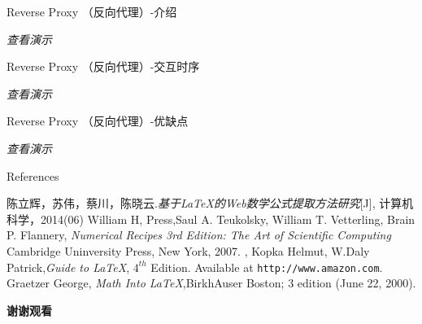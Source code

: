 \documentclass[aspectratio=169,xcolor=dvipsnames,UTF8]{beamer}
\begin{document}
\begin{frame}{ Reverse Proxy （反向代理）-介绍}
    \begin{block}{}
			\emph{查看演示}
	\end{block} 
\end{frame}

\begin{frame}{ Reverse Proxy （反向代理）-交互时序}
    \begin{block}{}
			\emph{查看演示}
	\end{block} 
\end{frame}

\begin{frame}{ Reverse Proxy （反向代理）-优缺点}
    \begin{block}{}
			\emph{查看演示}
	\end{block} 
\end{frame}

\begin{frame}{References}
    \footnotesize{
        \begin{thebibliography}{99}
        	陈立辉，苏伟，蔡川，陈晓云.\emph{基于LaTeX的Web数学公式提取方法研究}[J], 计算机科学，2014(06)
  William H, Press,Saul A. Teukolsky, William T. Vetterling, Brain P. Flannery, \emph{Numerical Recipes 3rd Edition: The Art of Scientific Computing} Cambridge Uninversity Press, New York, 2007.
  , Kopka Helmut, W.Daly Patrick,\emph{Guide to \LaTeX}, $4^{th}$ Edition. Available at \texttt{http://www.amazon.com}.
   Graetzer George, \emph{Math Into \LaTeX},BirkhAuser Boston; 3 edition (June 22, 2000). 
        \end{thebibliography}
    }
    \printbibliography
\end{frame}


\begin{frame}
    \Huge{\centerline{\textbf{谢谢观看}}}
\end{frame}

\end{document}
